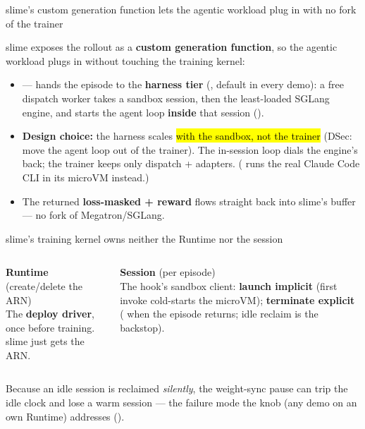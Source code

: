 \begin{frame}{slime's custom generation function lets the agentic workload plug in with no fork of the trainer}
{\footnotesize slime exposes the rollout as a \textbf{custom generation function}, so the agentic workload plugs in without touching the training kernel:\par}
\vspace{2mm}
\begin{itemize}\footnotesize\setlength{\itemsep}{2.2mm}
\item {} --- hands the episode to the \textbf{harness tier} (, default in every demo): a free dispatch worker takes a sandbox session, then the least-loaded SGLang engine, and starts the agent loop \textbf{inside} that session ().
\item \textbf{Design choice:} the harness scales \hl{with the sandbox, not the trainer} (DSec: move the agent loop out of the trainer). The in-session  loop dials the engine's  back; the trainer keeps only dispatch + adapters. ( runs the real Claude Code CLI in its microVM instead.)
\item The returned \textbf{loss-masked  + reward} flows straight back into slime's buffer --- no fork of Megatron/SGLang.
\end{itemize}
\end{frame}

\begin{frame}{slime's training kernel owns neither the Runtime nor the session}
\vspace{2mm}
\begin{columns}[T]
\colorbox{panel}{\parbox{\dimexpr\linewidth-2\fboxsep}{\footnotesize\textbf{\color{awsteal}Runtime} (create/delete the ARN)\\[1mm]
The \textbf{deploy driver}, once before training. slime just gets the ARN.}}
\colorbox{panel}{\parbox{\dimexpr\linewidth-2\fboxsep}{\footnotesize\textbf{\color{awsteal}Session} (per episode)\\[1mm]
The  hook's sandbox client: \textbf{launch implicit} (first invoke cold-starts the microVM); \textbf{terminate explicit} ( when the episode returns; idle reclaim is the backstop).}}
\end{columns}
\vspace{6mm}
{\small\raggedright Because an idle session is reclaimed \emph{silently}, the weight-sync pause can trip the idle clock and lose a warm session --- the failure mode the \hl{} knob (any demo on an own Runtime) addresses ().\par}
\end{frame}

